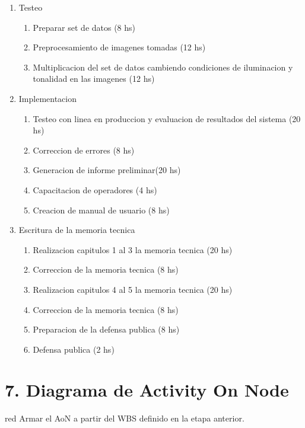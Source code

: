 \documentclass[11pt]{charter}
\begin{document}
\begin{enumerate}
\item Testeo
	\begin{enumerate}
	\item Preparar set de datos (8 hs)
	\item Preprocesamiento de imagenes tomadas (12 hs)
	\item Multiplicacion del set de datos cambiendo condiciones de iluminacion y tonalidad en las imagenes (12 hs)
	\end{enumerate}
\item Implementacion
	\begin{enumerate}
	\item Testeo con linea en produccion y evaluacion de resultados del sistema (20 hs)
	\item Correccion de errores (8 hs)
	\item Generacion de informe preliminar(20 hs)
	\item Capacitacion de operadores (4 hs)
	\item Creacion de manual de usuario (8 hs)
	\end{enumerate}
\item Escritura de la memoria tecnica
	\begin{enumerate}
	\item Realizacion capitulos 1 al 3 la memoria tecnica (20 hs) 
	\item Correccion de la memoria tecnica (8 hs)
	\item Realizacion capitulos 4 al 5 la memoria tecnica (20 hs)
	\item Correccion de la memoria tecnica (8 hs)
	\item Preparacion de la defensa publica (8 hs)
	\item Defensa publica (2 hs)
	
	\end{enumerate}

\end{enumerate}





\section{7. Diagrama de Activity On Node}
\label{sec:AoN}

\begin{consigna}{red}
Armar el AoN a partir del WBS definido en la etapa anterior. 



\end{consigna}
\end{document}
